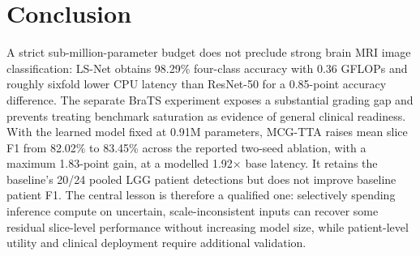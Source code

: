 \section{Conclusion}

A strict sub-million-parameter budget does not preclude strong brain MRI image classification: LS-Net obtains 98.29\% four-class accuracy with 0.36 GFLOPs and roughly sixfold lower CPU latency than ResNet-50 for a 0.85-point accuracy difference. The separate BraTS experiment exposes a substantial grading gap and prevents treating benchmark saturation as evidence of general clinical readiness. With the learned model fixed at 0.91M parameters, MCG-TTA raises mean slice F1 from 82.02\% to 83.45\% across the reported two-seed ablation, with a maximum 1.83-point gain, at a modelled 1.92$\times$ base latency. It retains the baseline's 20/24 pooled LGG patient detections but does not improve baseline patient F1. The central lesson is therefore a qualified one: selectively spending inference compute on uncertain, scale-inconsistent inputs can recover some residual slice-level performance without increasing model size, while patient-level utility and clinical deployment require additional validation.
